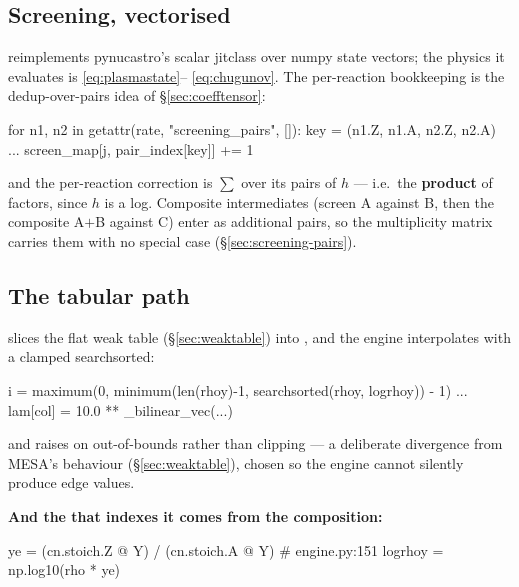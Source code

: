 \subsection{Screening, vectorised}
\label{sec:screening-code}

 reimplements pynucastro's scalar jitclass over numpy
state vectors; the physics it evaluates is \eqref{eq:plasmastate}--%
\eqref{eq:chugunov}. The per-reaction bookkeeping is the dedup-over-pairs idea
of \S\ref{sec:coefftensor}:

\begin{srclisting}
for n1, n2 in getattr(rate, "screening_pairs", []):
    key = (n1.Z, n1.A, n2.Z, n2.A)  ... screen_map[j, pair_index[key]] += 1
\end{srclisting}

and the per-reaction correction is $\sum$ over its pairs of $h$ --- i.e.\ the
\textbf{product} of factors, since $h$ is a log. Composite intermediates (screen
A against B, then the composite A$+$B against C) enter as additional pairs, so
the multiplicity matrix carries them with no special case
(\S\ref{sec:screening-pairs}).

\subsection{The tabular path}
\label{sec:tabular-path}

 slices the flat weak table
(\S\ref{sec:weaktable}) into , and the engine
interpolates with a clamped searchsorted:

\begin{srclisting}
i = maximum(0, minimum(len(rhoy)-1, searchsorted(rhoy, logrhoy)) - 1)
...
lam[col] = 10.0 ** _bilinear_vec(...)
\end{srclisting}

and raises on out-of-bounds rather than clipping --- a deliberate divergence
from MESA's behaviour (\S\ref{sec:weaktable}), chosen so the engine cannot
silently produce edge values.

\textbf{And the \rhoye{} that indexes it comes from the composition:}

\begin{srclisting}
ye = (cn.stoich.Z @ Y) / (cn.stoich.A @ Y)     # engine.py:151
logrhoy = np.log10(rho * ye)
\end{srclisting}

